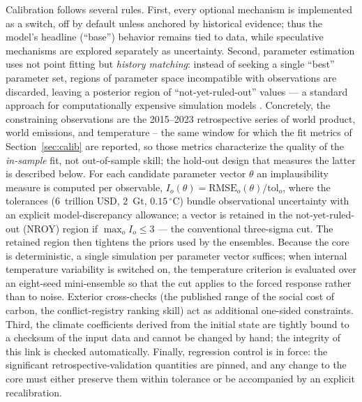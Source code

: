 \documentclass[a4paper,fleqn]{cas-sc}
\begin{document}
Calibration follows several rules. First, every optional mechanism is implemented as a switch, off
by default unless anchored by historical evidence; thus the model's headline (``base'') behavior
remains tied to data, while speculative mechanisms are explored separately as uncertainty. Second,
parameter estimation uses not point fitting but \emph{history matching}: instead of seeking a single
``best'' parameter set, regions of parameter space incompatible with observations are discarded,
leaving a posterior region of ``not-yet-ruled-out'' values --- a standard approach for
computationally expensive simulation models \citep{williamson2013}. Concretely, the constraining
observations are the 2015--2023 retrospective series of world product, world emissions, and
temperature -- the same window for which the fit metrics of Section~\ref{sec:calib} are
reported, so those metrics characterize the quality of the \emph{in-sample} fit, not
out-of-sample skill; the hold-out design that measures the latter is described below. For each candidate parameter vector $\theta$ an implausibility measure is computed
per observable, $I_o(\theta) = \mathrm{RMSE}_o(\theta) / \mathrm{tol}_o$, where the tolerances
(6~trillion USD, 2~Gt, $0.15\,^\circ$C) bundle observational uncertainty with an explicit
model-discrepancy allowance; a vector is retained in the not-yet-ruled-out (NROY) region if
$\max_o I_o \le 3$ --- the conventional three-sigma cut. The retained region then tightens the
priors used by the ensembles. Because the core is deterministic, a single simulation per parameter
vector suffices; when internal temperature variability is switched on, the temperature criterion
is evaluated over an eight-seed mini-ensemble so that the cut applies to the forced response
rather than to noise. Exterior cross-checks (the published range of the social cost of carbon,
the conflict-registry ranking skill) act as additional one-sided constraints. Third, the climate coefficients
derived from the initial state are tightly bound to a checksum of the input data and cannot be
changed by hand; the integrity of this link is checked automatically. Finally, regression control is
in force: the significant retrospective-validation quantities are pinned, and any change to the core
must either preserve them within tolerance or be accompanied by an explicit recalibration.
\end{document}

